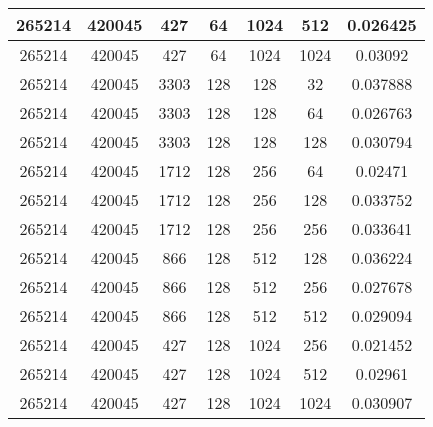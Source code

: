 \documentclass[9pt]{article}
\begin{document}
\begin{tabular}{|c|c|c|c|c|c|c| }
\hline
265214  & 420045  & 427  & 64  & 1024  & 512  & 0.026425 \\
\hline
265214  & 420045  & 427  & 64  & 1024  & 1024  & 0.03092 \\
\hline
265214  & 420045  & 3303  & 128  & 128  & 32  & 0.037888 \\
\hline
265214  & 420045  & 3303  & 128  & 128  & 64  & 0.026763 \\
\hline
265214  & 420045  & 3303  & 128  & 128  & 128  & 0.030794 \\
\hline
265214  & 420045  & 1712  & 128  & 256  & 64  & 0.02471 \\
\hline
265214  & 420045  & 1712  & 128  & 256  & 128  & 0.033752 \\
\hline
265214  & 420045  & 1712  & 128  & 256  & 256  & 0.033641 \\
\hline
265214  & 420045  & 866  & 128  & 512  & 128  & 0.036224 \\
\hline
265214  & 420045  & 866  & 128  & 512  & 256  & 0.027678 \\
\hline
265214  & 420045  & 866  & 128  & 512  & 512  & 0.029094 \\
\hline
265214  & 420045  & 427  & 128  & 1024  & 256  & 0.021452 \\
\hline
265214  & 420045  & 427  & 128  & 1024  & 512  & 0.02961 \\
\hline
265214  & 420045  & 427  & 128  & 1024  & 1024  & 0.030907 \\
\hline
\end{tabular}
 
\end{document}
